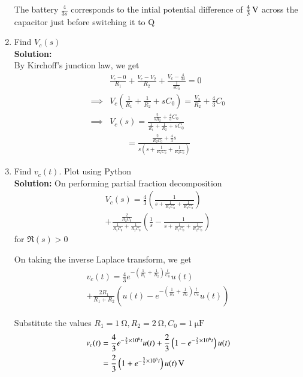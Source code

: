 \documentclass[journal,12pt,twocolumn]{IEEEtran}
\newcommand{\solution}{\noindent \textbf{Solution: }}
\providecommand{\brak}[1]{\ensuremath{\left(#1\right)}}
\numberwithin{equation}{section}
\numberwithin{figure}{section}
\renewcommand\thesection{\arabic{section}}
\begin{document}
\begin{enumerate}[label=\thesection.\arabic*,ref=\thesection.\theenumi]
			The battery $\frac{4}{3s}$ corresponds to the intial potential difference of $\SI[parse-numbers=false]{\frac43}{\volt}$ across the capacitor just before switching it to Q\\
			
		\item Find $V_c(s)$\\
	
		\solution\\
			By Kirchoff's junction law, we get
			\begin{align}
				&\frac{V_c - 0}{R_1} + 	\frac{V_c - V_2}{R_2} + \frac{V_c - \frac{4}{3s}}{\frac{1}{sC_0}} = 0 \\
				\implies &V_c \brak{\frac{1}{R_1} + \frac{1}{R_2} + sC_0} =  \frac{V_2}{R_2} + \frac{4}{3}C_0 \\
				\implies &V_c(s) = \frac{\frac{2}{sR_2} + \frac{4}{3}C_0}{\frac{1}{R_1} + \frac{1}{R_2} + sC_0} \\
				&\qquad = \frac{\frac{2}{R_2C_0} + \frac43 s}{s\brak{s + \frac{1}{R_1C_0} + \frac{1}{R_2C_0}}} 
			\end{align}

		\item Find $v_c(t)$. Plot using Python\\
	
		\solution On performing partial fraction decomposition
			\begin{multline}
				V_{c}(s) = \frac{4}{3}\brak{\frac{1}{s + \frac{1}{R_1C_0} + \frac{1}{R_2C_0}}} \\
				+ \frac{\frac{2}{R_2C_0}}{\frac{1}{R_1C_0} +\frac{1}{R_2C_0}}\brak{\frac{1}{s} - \frac{1}{s + \frac{1}{R_1C_0} + \frac{1}{R_2C_0}}} 
			\end{multline}
			for $\Re(s) > 0$
	
			On taking the inverse Laplace transform, we get
			\begin{multline}
				v_c(t) = \frac{4}{3}e^{-\brak{\frac{1}{R_1} + \frac{1}{R_2}}\frac{t}{C_0}}u(t) \\
				+ \frac{2R_1}{R_1 + R_2} \brak{u(t) - e^{-\brak{\frac{1}{R_1} + \frac{1}{R_2}}\frac{t}{C_0}}u(t) } 
			\end{multline}
	
			Substitute the values $R_1 = \SI{1}{\ohm}, R_2 = \SI{2}{\ohm}, C_0 = \SI{1}{\micro\farad}$
			\begin{align}
				v_c(t) &= \frac43 e^{-\frac{3}{2} \times 10^6 t}u(t) + \frac{2}{3}\brak{1 - e^{-\frac{3}{2} \times 10^6 t}}u(t) \\
				&= \SI[parse-numbers=false]{\frac{2}{3} \brak{1 + e^{-\frac{3}{2} \times 10^6 t}} u(t)}{\volt}
			\end{align}
			

\end{enumerate}
\end{document}
